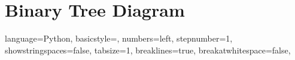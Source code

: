 \documentclass{article}
\begin{document}
\section{Binary Tree Diagram} 

\lstset
{
    language=Python,
    basicstyle=\footnotesize,
    numbers=left,
    stepnumber=1,
    showstringspaces=false,
    tabsize=1,
    breaklines=true,
    breakatwhitespace=false,
}

\end{document}
